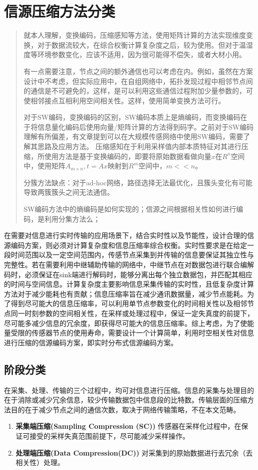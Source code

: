 \section{信源压缩方法分类}

\begin{quote}
    就本人理解，变换编码，压缩感知等方法，使用矩阵计算的方法实现维度变换，对于数据流较大，在综合权衡计算复杂度之后，较为使用。但对于温湿度等环境参数变化，应该不适用，因为很可能得不偿失，或者大材小用。

    有一点需要注意，节点之间的额外通信也可以考虑在内。例如，虽然在方案设计中不考虑，但实际应用中，在自组网络中，拓扑发现过程中相邻节点间的通信是不可避免的，这样，是可以利用这些通信过程附加少量参数的，可使相邻接点互相利用空间相关性。这样，使用简单变换方法可行。

    对于SW编码，变换编码的区别，SW编码本质上是熵编码，而变换编码在于将信息量化编码后使用向量/矩阵计算的方法得到码字。\textcolor[rgb]{1,0,0}{之前对于SW编码理解有所偏差，有文章提到可以在大规模传感网络中使用SW编码，需要了解其思路及应用方法}。
    压缩感知在于利用采样值内部本质特征对其进行压缩，所使用方法是基于变换编码的，即要将原始数据看做向量$x$在$R^n$空间中，使用矩阵$A_{m\times n}, t=Ax$映射到$R^m$空间中，$m<<n$。


    分簇方法缺点：对于ad-hoc网络，路径选择无法最优化，且簇头变化有可能导致两簇簇头之间无法通信。
    
    SW编码方法中的熵编码是如何实现的；信源之间根据相关性如何进行编码，是利用分集方法么；
\end{quote}

在需要对信息进行实时传输的应用场景下，结合实时性以及节能性，设计合理的信源编码方案，则必须对计算复杂度和信息压缩率综合权衡。实时性要求是在给定一段时间范围以及一定空间范围内，传感节点采集到并传输的信息要保证其独立性与完整性。若在需要利用中继辅助传输的网络中，中继节点在对数据包进行联合编解码时，必须保证在sink端进行解码时，能够分离出每个独立数据包，并匹配其相应的时间与空间信息。计算复杂度主要影响信息采集传输的实时性，且低复杂度计算方法对于减少能耗也有贡献；信息压缩率旨在减少通讯数据量，减少节点能耗。为了得到尽可能大的信息压缩率，可以利用单节点参数变化的时间相关性以及相邻节点同一时刻参数的空间相关性，在采样或处理过程中，保证一定失真度的前提下，尽可能多减少信息的冗余度，即获得尽可能大的信息压缩率。综上考虑，为了使能量受限的传感器节点的使用寿命，需要设计一个计算简单，利用时空相关性对信息进行压缩的信源编码方案，即实时分布式信源编码方案。

\subsection{阶段分类}
在采集、处理、传输的三个过程中，均可对信息进行压缩。信息的采集与处理目的在于消除或减少冗余信息，较少传输数据包中信息段的比特数。传输层面的压缩方法目的在于减少节点之间的通信次数，取决于网络传输策略，不在本文范畴。
\begin{enumerate}
	\item \textbf{采集端压缩(Sampling Compression (SC))} 传感器在采样化过程中，在保证可接受的采样失真范围前提下，尽可能减少采样操作。
        \item \textbf{处理端压缩(Data Compression(DC))} 对采集到的原始数据进行去冗余（去相关性）处理。
\end{enumerate}

